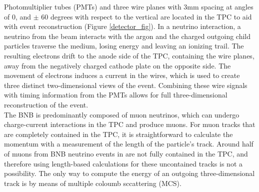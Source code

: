 Photomultiplier tubes (PMTs) and three wire planes with 3mm spacing at angles of 0, and $\pm$ 60 degrees with respect to the vertical are located in the TPC to aid with event reconstruction (Figure \ref{detector_fig}). In a neutrino interaction, a neutrino from the beam interacts with the argon and the charged outgoing child particles traverse the medium, losing energy and leaving an ionizing trail. The resulting electrons drift to the anode side of the TPC, containing the wire planes, away from the negatively charged cathode plate on the opposite side. The movement of electrons induces a current in the wires, which is used to create three distinct two-dimensional views of the event. Combining these wire signals with timing information from the PMTs allows for full three-dimensional reconstruction of the event.\\





The BNB is predominantly composed of muon neutrinos, which can undergo charge-current interactions in the TPC and produce muons. For muon tracks that are completely contained in the TPC, it is straightforward to calculate the momentum with a measurement of the length of the particle's track. Around half of muons from BNB neutrino events in {\ub} are not fully contained in the TPC, and therefore using length-based calculations for these uncontained tracks is not a possibility. The only way to compute the energy of an outgoing three-dimensional track is by means of multiple coloumb sccattering (MCS). \\

